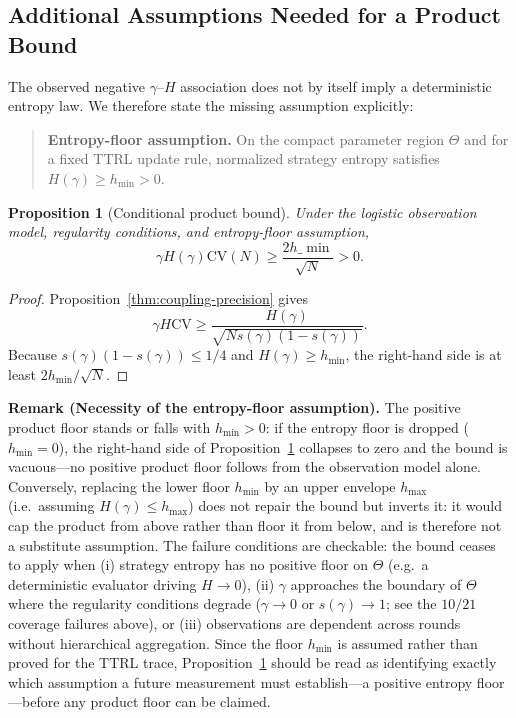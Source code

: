 \documentclass[11pt]{article}
\newtheorem{proposition}{Proposition}
\begin{document}
\subsection{Additional Assumptions Needed for a Product Bound}

The observed negative $\gamma$--$H$ association does not by itself imply a deterministic entropy law. We therefore state the missing assumption explicitly:

\begin{quote}
\textbf{Entropy-floor assumption.} On the compact parameter region $\Theta$ and for a fixed TTRL update rule, normalized strategy entropy satisfies $H(\gamma)\ge h_{\min}>0$.
\end{quote}

\begin{proposition}[Conditional product bound]\label{thm:impossibility}
Under the logistic observation model, regularity conditions, and entropy-floor assumption,
\[
\gamma H(\gamma)\mathrm{CV}(N)
\geq \frac{2h\_{\min}}{\sqrt N}>0.
\]
\end{proposition}

\begin{proof}
Proposition~\ref{thm:coupling-precision} gives
\[
\gamma H\mathrm{CV}\geq
\frac{H(\gamma)}{\sqrt{N s(\gamma)(1-s(\gamma))}}.
\]
Because $s(\gamma)(1-s(\gamma))\leq1/4$ and $H(\gamma)\ge h_{\min}$, the right-hand side is at least $2h_{\min}/\sqrt N$.
\end{proof}

\noindent\textbf{Remark (Necessity of the entropy-floor assumption).}
The positive product floor stands or falls with $h_{\min}>0$: if the entropy floor is dropped ($h_{\min}=0$), the right-hand side of Proposition~\ref{thm:impossibility} collapses to zero and the bound is vacuous---no positive product floor follows from the observation model alone. Conversely, replacing the lower floor $h_{\min}$ by an upper envelope $h_{\max}$ (i.e.\ assuming $H(\gamma)\le h_{\max}$) does not repair the bound but inverts it: it would cap the product from above rather than floor it from below, and is therefore not a substitute assumption. The failure conditions are checkable: the bound ceases to apply when (i) strategy entropy has no positive floor on $\Theta$ (e.g.\ a deterministic evaluator driving $H\to 0$), (ii) $\gamma$ approaches the boundary of $\Theta$ where the regularity conditions degrade ($\gamma\to 0$ or $s(\gamma)\to 1$; see the $10/21$ coverage failures above), or (iii) observations are dependent across rounds without hierarchical aggregation. Since the floor $h_{\min}$ is assumed rather than proved for the TTRL trace, Proposition~\ref{thm:impossibility} should be read as identifying exactly which assumption a future measurement must establish---a positive entropy floor---before any product floor can be claimed.
\end{document}
